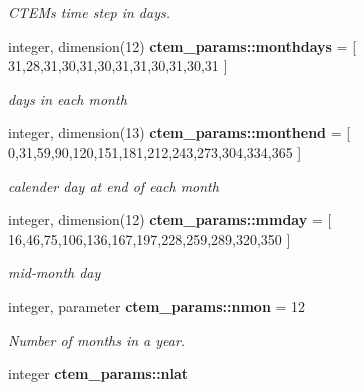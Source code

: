 \begin{DoxyCompactItemize}
\begin{DoxyCompactList}\small\item\em C\+T\+E\+M\textquotesingle{}s time step in days. \end{DoxyCompactList}\item 
\hypertarget{namespacectem__params_a4ef8efd46b3f253fcaa1d9e7626f63ff}{}integer, dimension(12) {\bfseries ctem\+\_\+params\+::monthdays} = \mbox{[} 31,28,31,30,31,30,31,31,30,31,30,31 \mbox{]}\label{namespacectem__params_a4ef8efd46b3f253fcaa1d9e7626f63ff}

\begin{DoxyCompactList}\small\item\em days in each month \end{DoxyCompactList}\item 
\hypertarget{namespacectem__params_aa3400a32285b1fb0f89ee49346af8a71}{}integer, dimension(13) {\bfseries ctem\+\_\+params\+::monthend} = \mbox{[} 0,31,59,90,120,151,181,212,243,273,304,334,365 \mbox{]}\label{namespacectem__params_aa3400a32285b1fb0f89ee49346af8a71}

\begin{DoxyCompactList}\small\item\em calender day at end of each month \end{DoxyCompactList}\item 
\hypertarget{namespacectem__params_afe122ccbefaa2e3252ce8574835068c1}{}integer, dimension(12) {\bfseries ctem\+\_\+params\+::mmday} = \mbox{[} 16,46,75,106,136,167,197,228,259,289,320,350 \mbox{]}\label{namespacectem__params_afe122ccbefaa2e3252ce8574835068c1}

\begin{DoxyCompactList}\small\item\em mid-\/month day \end{DoxyCompactList}\item 
\hypertarget{namespacectem__params_a7d9aa770be284cd553a5356105ce73fb}{}integer, parameter {\bfseries ctem\+\_\+params\+::nmon} = 12\label{namespacectem__params_a7d9aa770be284cd553a5356105ce73fb}

\begin{DoxyCompactList}\small\item\em Number of months in a year. \end{DoxyCompactList}\item 
\hypertarget{namespacectem__params_a1ec48278b053d539920e6226a28bd5de}{}integer {\bfseries ctem\+\_\+params\+::nlat}\label{namespacectem__params_a1ec48278b053d539920e6226a28bd5de}


\end{DoxyCompactItemize}
